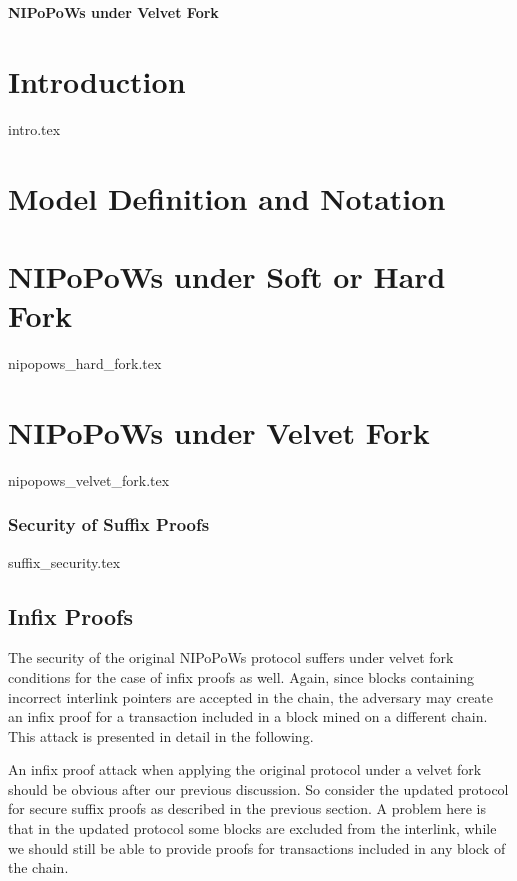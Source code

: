 \documentclass[11pt,a4paper]{article}
\begin{document}
\begin{center}
\begin{Large}
\textbf{NIPoPoWs under Velvet Fork\\}
\end{Large}

\end{center}

\section{Introduction}
{intro.tex}

\section{Model Definition and Notation}

\section{NIPoPoWs under Soft or Hard Fork}
{nipopows_hard_fork.tex}

\section{NIPoPoWs under Velvet Fork}
{nipopows_velvet_fork.tex}


\subsubsection{Security of Suffix Proofs}
{suffix_security.tex}


\subsection{Infix Proofs}
The security of the original NIPoPoWs protocol suffers under velvet fork conditions for the case of infix proofs as well. Again, since blocks containing incorrect interlink pointers are accepted in the chain, the adversary may create an infix proof for a transaction included in a block mined on a different chain. This attack is presented in detail in the following.

An infix proof attack when applying the original protocol under a velvet fork should be obvious after our previous discussion. So consider the updated protocol for secure suffix proofs as described in the previous section. A problem here is that in the updated protocol some blocks are excluded from the interlink, while we should still be able to provide proofs for transactions included in any block of the chain. 
\end{document}
